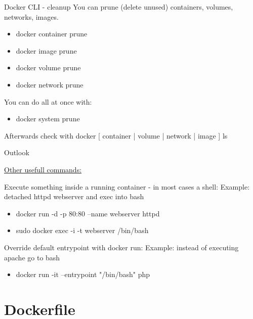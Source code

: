\documentclass[10pt,aspectratio=\ratio,
compress
]{beamer}
\begin{document}
\begin{frame}{Docker CLI - cleanup}
You can prune (delete unused) containers, volumes, networks, images.

\begin{itemize}
	\item docker container prune
	\item docker image prune
	\item docker volume prune
	\item docker network prune
\end{itemize}
You can do all at once with:
\begin{itemize}
	\item docker system prune
\end{itemize}
Afterwards check with docker [ container | volume | network | image ] ls

\end{frame}

\begin{frame}{Outlook}

\href{https://docs.docker.com/engine/reference/run/}{Other usefull commands:}

Execute something inside a running container - in most cases a shell:
Example: detached httpd webserver and exec into bash
\begin{itemize}
	\item docker run -d -p 80:80 --name webserver httpd
	\item sudo docker exec -i -t webserver /bin/bash
\end{itemize}


Override default entrypoint with docker run:
Example: instead of executing apache go to bash
\begin{itemize}
	\item docker run -it --entrypoint "/bin/bash" php
\end{itemize}

\end{frame}


\section{Dockerfile}
\end{document}
